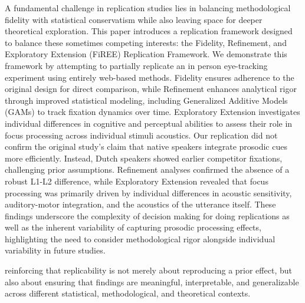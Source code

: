 A fundamental challenge in replication studies lies in balancing methodological fidelity with statistical conservatism while also leaving space for deeper theoretical exploration. This paper introduces a replication framework designed to balance these sometimes competing interests: the Fidelity, Refinement, and Exploratory Extension (FiREE) Replication Framework. We demonstrate this framework by attempting to partially replicate an in person eye-tracking experiment \citep{Ge2021} using entirely web-based methods. Fidelity ensures adherence to the original design for direct comparison, while Refinement enhances analytical rigor through improved statistical modeling, including Generalized Additive Models (GAMs) to track fixation dynamics over time. Exploratory Extension investigates individual differences in cognitive and perceptual abilities to assess their role in focus processing across individual stimuli acoustics. Our replication did not confirm the original study’s claim that native speakers integrate prosodic cues more efficiently. Instead, Dutch speakers showed earlier competitor fixations, challenging prior assumptions. Refinement analyses confirmed the absence of a robust L1-L2 difference, while Exploratory Extension revealed that focus processing was primarily driven by individual differences in acoustic sensitivity, auditory-motor integration, and the acoustics of the utterance itself. These findings underscore the complexity of decision making for doing replications as well as the inherent variability of capturing prosodic processing effects, highlighting the need to consider methodological rigor alongside individual variability in future studies.

reinforcing that replicability is not merely about reproducing a prior effect, but also about ensuring that findings are meaningful, interpretable, and generalizable across different statistical, methodological, and theoretical contexts.